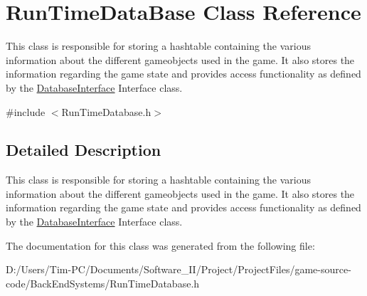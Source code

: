 \hypertarget{class_run_time_data_base}{}\section{Run\+Time\+Data\+Base Class Reference}
\label{class_run_time_data_base}


This class is responsible for storing a hashtable containing the various information about the different gameobjects used in the game. It also stores the information regarding the game state and provides access functionality as defined by the \hyperlink{class_database_interface}{Database\+Interface} Interface class.  




{\ttfamily \#include $<$Run\+Time\+Database.\+h$>$}



\subsection{Detailed Description}
This class is responsible for storing a hashtable containing the various information about the different gameobjects used in the game. It also stores the information regarding the game state and provides access functionality as defined by the \hyperlink{class_database_interface}{Database\+Interface} Interface class. 

The documentation for this class was generated from the following file\+:\begin{DoxyCompactItemize}
\item 
D\+:/\+Users/\+Tim-\/\+P\+C/\+Documents/\+Software\+\_\+\+I\+I/\+Project/\+Project\+Files/game-\/source-\/code/\+Back\+End\+Systems/Run\+Time\+Database.\+h\end{DoxyCompactItemize}
